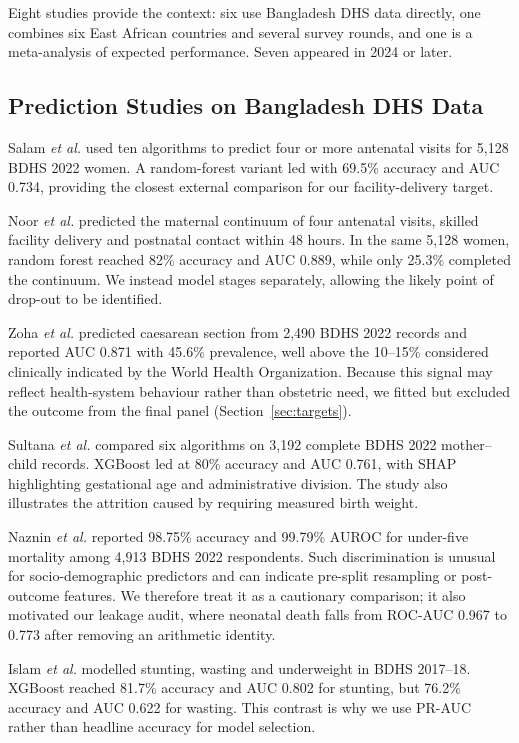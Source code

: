 \documentclass[conference]{IEEEtran}
\begin{document}
Eight studies provide the context: six use Bangladesh DHS data directly, one
combines six East African countries and several survey rounds, and one is a
meta-analysis of expected performance. Seven appeared in 2024 or later.

\subsection{Prediction Studies on Bangladesh DHS Data}
Salam \textit{et al.} \cite{salam2025} used ten algorithms to predict four or
more antenatal visits for 5,128 BDHS 2022 women. A random-forest variant led
with 69.5\% accuracy and AUC 0.734, providing the closest external comparison
for our facility-delivery target.

Noor \textit{et al.} \cite{noor2025} predicted the maternal continuum of four
antenatal visits, skilled facility delivery and postnatal contact within 48
hours. In the same 5,128 women, random forest reached 82\% accuracy and AUC
0.889, while only 25.3\% completed the continuum. We instead model stages
separately, allowing the likely point of drop-out to be identified.

Zoha \textit{et al.} \cite{zoha2025} predicted caesarean section from 2,490
BDHS 2022 records and reported AUC 0.871 with 45.6\% prevalence, well above
the 10--15\% considered clinically indicated by the World Health Organization.
Because this signal may reflect health-system behaviour rather than obstetric
need, we fitted but excluded the outcome from the final panel
(Section~\ref{sec:targets}).

Sultana \textit{et al.} \cite{sultana2025} compared six algorithms on 3,192
complete BDHS 2022 mother--child records. XGBoost led at 80\% accuracy and AUC
0.761, with SHAP highlighting gestational age and administrative division. The
study also illustrates the attrition caused by requiring measured birth weight.

Naznin \textit{et al.} \cite{naznin2025} reported 98.75\% accuracy and 99.79\%
AUROC for under-five mortality among 4,913 BDHS 2022 respondents. Such
discrimination is unusual for socio-demographic predictors and can indicate
pre-split resampling or post-outcome features. We therefore treat it as a
cautionary comparison; it also motivated our leakage audit, where neonatal
death falls from ROC-AUC 0.967 to 0.773 after removing an arithmetic identity.

Islam \textit{et al.} \cite{islam2024} modelled stunting, wasting and
underweight in BDHS 2017--18. XGBoost reached 81.7\% accuracy and AUC 0.802
for stunting, but 76.2\% accuracy and AUC 0.622 for wasting. This contrast is
why we use PR-AUC rather than headline accuracy for model selection.
\end{document}
